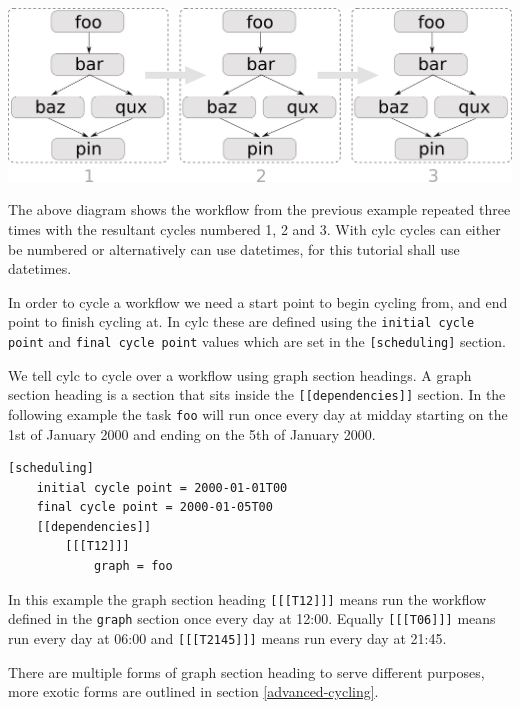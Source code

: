 \begin{center}
    \includegraphics[width=0.6\columnwidth]{resources/tex/cylc-cycle-graph}
\end{center}

The above diagram shows the workflow from the previous example repeated three
times with the resultant cycles numbered 1, 2 and 3. With cylc cycles can
either be numbered or alternatively can use datetimes, for this tutorial shall
use datetimes.

In order to cycle a workflow we need a start point to begin cycling from, and
end point to finish cycling at. In cylc these are defined using the
\lstinline=initial cycle point= and \lstinline=final cycle point= values which
are set in the \lstinline=[scheduling]= section.

We tell cylc to cycle over a workflow using graph section headings. A graph
section heading is a section that sits inside the
\lstinline=[[dependencies]]= section. In the following example the task
\lstinline{foo} will run once every day at midday starting on the 1st of
January 2000 and ending on the 5th of January 2000.

\begin{lstlisting}[language=suiterc]
[scheduling]
    initial cycle point = 2000-01-01T00
    final cycle point = 2000-01-05T00
    [[dependencies]]
        [[[T12]]]
            graph = foo
\end{lstlisting}

In this example the graph section heading \lstinline=[[[T12]]]= means run
the workflow defined in the \lstinline=graph= section once every day at
12:00. Equally \lstinline=[[[T06]]]= means run every day at 06:00 and
\lstinline=[[[T2145]]]= means run every day at 21:45.


There are multiple forms of graph section heading to serve different purposes,
more exotic forms are outlined in section \ref{advanced-cycling}.


